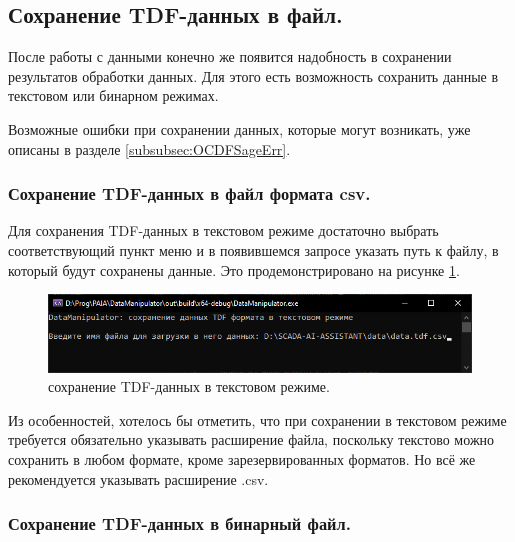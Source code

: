 \subsection{ \standartTitleFont
  Сохранение TDF-данных в файл.
} \label{subsec:TDFSafe}

{\standartFont

  \par После работы с данными конечно же появится надобность в сохранении результатов обработки данных. Для этого есть возможность сохранить данные в текстовом или бинарном режимах.

  \par Возможные ошибки при сохранении данных, которые могут возникать, уже описаны в разделе \ref{subsubsec:OCDFSageErr}.

  \par
}

\subsubsection{ \standartTitleFont
  Сохранение TDF-данных в файл формата csv.
} \label{subsubsec:TDFSafeCSV}

{\standartFont

  \par Для сохранения TDF-данных в текстовом режиме достаточно выбрать соответствующий пункт меню и в появившемся запросе указать путь к файлу, в который будут сохранены данные. Это продемонстрировано на рисунке \ref{fig:TDFsafeCSV}.

  \begin{figure}[H]
    \centering
    \includegraphics[width=\textwidth]{images/forDataManipulator/TDFsafeCSV.png}
    \caption{сохранение TDF-данных в текстовом режиме.}
    \label{fig:TDFsafeCSV}
  \end{figure}

  \par Из особенностей, хотелось бы отметить, что при сохранении в текстовом режиме требуется обязательно указывать расширение файла, поскольку текстово можно сохранить в любом формате, кроме зарезервированных форматов. Но всё же рекомендуется указывать расширение .csv.
}

\subsubsection{ \standartTitleFont
  Сохранение TDF-данных в бинарный файл.
} \label{subsubsec:TDFSafeBIN}

